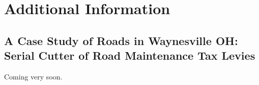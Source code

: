\clearpage


\section{Additional Information} \label{sec:appxc}

\subsection{A Case Study of Roads in Waynesville OH: Serial Cutter of Road Maintenance Tax Levies}

Coming very soon.





